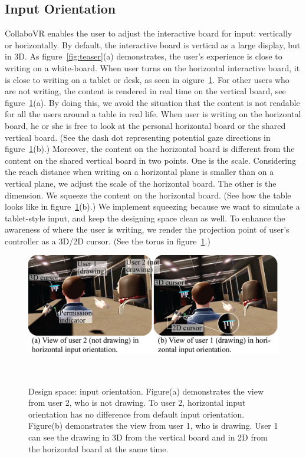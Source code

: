 \documentclass{sigchi}
\begin{document}
\subsection{Input Orientation}
CollaboVR enables the user to adjust the interactive board for input: vertically or horizontally. By default, the interactive board is vertical as a large display, but in 3D. As figure~\ref{fig:teaser}(a) demonstrates, the user's experience is close to writing on a white-board. When user turns on the horizontal interactive board, it is close to writing on a tablet or desk, as seen in oigure~\ref{fig:inputorientation}. For other users who are not writing, the content is rendered in real time on the vertical board, see figure~\ref{fig:inputorientation}(a). By doing this, we avoid the situation that the content is not readable for all the users around a table in real life. When user is writing on the horizontal board, he or she is free to look at the personal horizontal board or the shared vertical board. (See the dash dot representing potential gaze directions in figure~\ref{fig:inputorientation}(b).) Moreover, the content on the horizontal board is different from the content on the shared vertical board in two points. One is the scale. Considering the reach distance when writing on a horizontal plane is smaller than on a vertical plane, we adjust the scale of the horizontal board. The other is the dimension. We squeeze the content on the horizontal board. (See how the table looks like in figure~\ref{fig:inputorientation}(b).) We implement squeezing because we want to simulate a tablet-style input, and keep the designing space clean as well. To enhance the awareness of where the user is writing, we render the projection point of user's controller as a 3D/2D cursor. (See the torus in figure~\ref{fig:inputorientation}.)

\begin{figure}[tb!]
 \centering
 \includegraphics[width=0.95\columnwidth]{Figure4.png}
 \caption{Design space: input orientation. Figure(a) demonstrates the view from user 2, who is not drawing. To user 2, horizontal input orientation has no difference from default input orientation. Figure(b) demonstrates the view from user 1, who is drawing. User 1 can see the drawing in 3D from the vertical board and in 2D from the horizontal board at the same time.
 }~\label{fig:inputorientation}
\end{figure}
\end{document}
